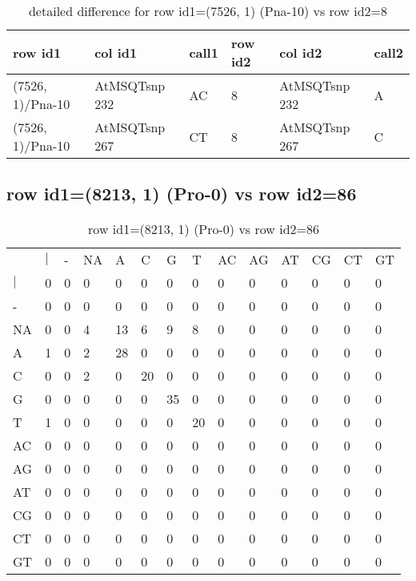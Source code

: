 \begin{center}
\begin{longtable}{|l|l|l|l|l|l|}
\caption{detailed difference for row id1=(7526, 1) (Pna-10) vs row id2=8} \label{table_dm343}\\
\hline
row id1&col id1&call1&row id2&col id2&call2\\
\hline
(7526, 1)/Pna-10&AtMSQTsnp 232&AC&8&AtMSQTsnp 232&A\\
(7526, 1)/Pna-10&AtMSQTsnp 267&CT&8&AtMSQTsnp 267&C\\
\hline
\end{longtable}
\end{center}

\subsection{row id1=(8213, 1) (Pro-0) vs row id2=86}
\begin{center}
\begin{longtable}{|l|l|l|l|l|l|l|l|l|l|l|l|l|l|}
\caption{row id1=(8213, 1) (Pro-0) vs row id2=86} \label{table_dm344}\\
\hline
\\
\hline
&$|$&-&NA&A&C&G&T&AC&AG&AT&CG&CT&GT\\
$|$&0&0&0&0&0&0&0&0&0&0&0&0&0\\
-&0&0&0&0&0&0&0&0&0&0&0&0&0\\
NA&0&0&4&13&6&9&8&0&0&0&0&0&0\\
A&1&0&2&28&0&0&0&0&0&0&0&0&0\\
C&0&0&2&0&20&0&0&0&0&0&0&0&0\\
G&0&0&0&0&0&35&0&0&0&0&0&0&0\\
T&1&0&0&0&0&0&20&0&0&0&0&0&0\\
AC&0&0&0&0&0&0&0&0&0&0&0&0&0\\
AG&0&0&0&0&0&0&0&0&0&0&0&0&0\\
AT&0&0&0&0&0&0&0&0&0&0&0&0&0\\
CG&0&0&0&0&0&0&0&0&0&0&0&0&0\\
CT&0&0&0&0&0&0&0&0&0&0&0&0&0\\
GT&0&0&0&0&0&0&0&0&0&0&0&0&0\\
\hline
\end{longtable}
\end{center}

